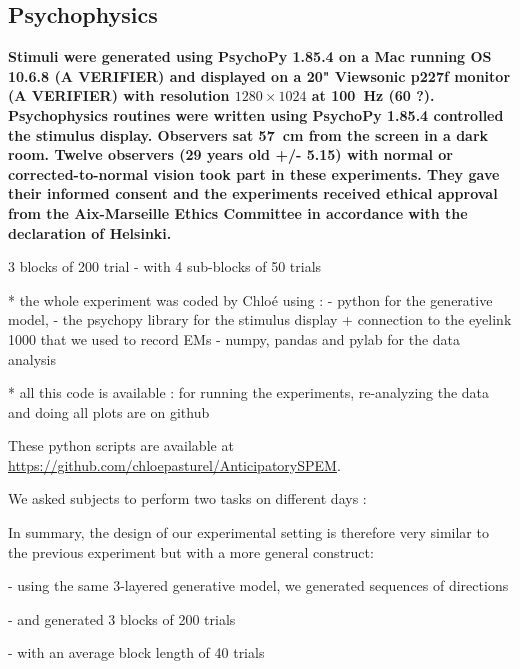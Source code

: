 \documentclass[profile,final,english, draft]{article}%
\begin{document}
\subsection{Psychophysics}




\textbf{Stimuli were generated using PsychoPy 1.85.4 on a Mac running OS 10.6.8 (A VERIFIER) and displayed on a 20" Viewsonic p227f monitor (A VERIFIER) with resolution $1280\times 1024$ at 100~\si{\Hz} (60 ?). Psychophysics routines were written using PsychoPy 1.85.4 controlled the stimulus display. Observers sat 57~\si{\cm} from the screen in a dark room. Twelve observers (29 years old +/- 5.15) with normal or corrected-to-normal vision took part in these experiments. They gave their informed consent and the experiments received ethical approval from the Aix-Marseille Ethics Committee in accordance with the declaration of Helsinki.}


3 blocks of 200 trial - with 4 sub-blocks of 50 trials


 * the whole experiment was coded by Chloé using :
 - python for the generative model,
 - the psychopy library for the stimulus display + connection to the eyelink 1000 that we used to record EMs
 - numpy, pandas and pylab for the data analysis

  * all this code is available : for running the experiments, re-analyzing the data and doing all plots are on github

These python scripts are available at \url{https://github.com/chloepasturel/AnticipatorySPEM}.


We asked subjects to perform two tasks on different days :

In summary, the design of our experimental setting is therefore very similar to the previous experiment but with a more general construct:

- using the same 3-layered generative model, we generated sequences of directions

- and generated 3 blocks of 200 trials

- with an average block length of 40 trials
\end{document}
